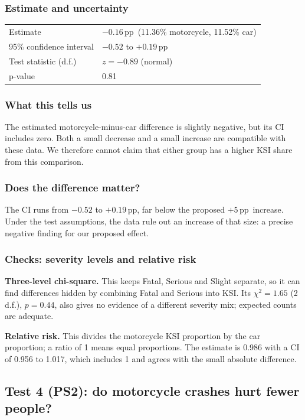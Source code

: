 \documentclass[10pt,a4paper,twocolumn]{article}
\newcommand{\pp}{\,pp}
\begin{document}
\subsubsection*{Estimate and uncertainty}
{\small
\begin{tabularx}{\linewidth}{@{}K{3.4cm} Y@{}}
\toprule
Estimate & $-0.16$\pp\ (11.36\% motorcycle, 11.52\% car) \\
95\% confidence interval & $-0.52$ to $+0.19$\pp \\
Test statistic (d.f.) & $z=-0.89$ (normal) \\
p-value & 0.81 \\
\bottomrule
\end{tabularx}}

\subsubsection*{What this tells us}
The estimated motorcycle-minus-car difference is slightly negative, but its CI includes zero.
Both a small decrease and a small increase are compatible with these data.
We therefore cannot claim that either group has a higher KSI share from this comparison.

\subsubsection*{Does the difference matter?}
The CI runs from $-0.52$ to $+0.19$\pp, far below the proposed $+5$\pp\ increase.
Under the test assumptions, the data rule out an increase of that size: a precise
negative finding for our proposed effect.

\subsubsection*{Checks: severity levels and relative risk}
\textbf{Three-level chi-square.} This keeps Fatal, Serious and Slight separate, so it can find
differences hidden by combining Fatal and Serious into KSI. Its $\chi^2=1.65$ (2 d.f.),
$p=0.44$, also gives no evidence of a different severity mix; expected counts are adequate.

\textbf{Relative risk.} This divides the motorcycle KSI proportion by the car proportion;
a ratio of 1 means equal proportions. The estimate is 0.986 with a CI of 0.956 to 1.017,
which includes 1 and agrees with the small absolute difference.

\subsection*{Test 4 (PS2): do motorcycle crashes hurt fewer people?}
\end{document}
